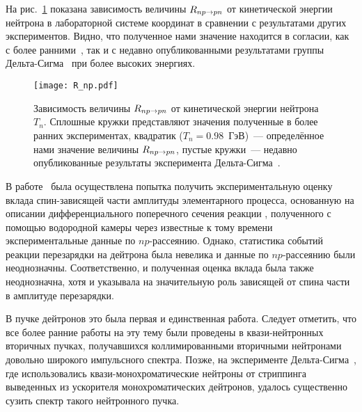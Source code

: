 На рис.~\ref{fig:R_np} показана зависимость величины $R_{np \rightarrow pn}$ от кинетической
энергии нейтрона в лабораторной системе координат в сравнении с результатами
других экспериментов. Видно, что полученное нами значение находится в согласии,
как с более ранними~\cite{pag88,lehar09}, так и с недавно опубликованными
результатами группы Дельта-Сигма~\cite{shar09} при более высоких энергиях.

\begin{figure}[!h]
  \centering
  \texttt{[image: R\_np.pdf]}
  \caption{Зависимость величины $R_{np \rightarrow pn}$ от кинетической энергии нейтрона
    $T_n$. Сплошные кружки представляют значения полученные в более ранних
    экспериментах, квадратик ($T_n = 0.98$~ГэВ)~--- определённое нами значение
    величины $R_{np \rightarrow pn}$, пустые кружки~--- недавно опубликованные результаты
    эксперимента Дельта-Сигма~\cite{shar09}.}
  \label{fig:R_np}
\end{figure}

В работе~\cite{alad75_2} была осуществлена попытка получить экспериментальную
оценку вклада спин-зависящей части амплитуды элементарного \np процесса,
основанную на описании дифференциального поперечного сечения реакции \dpchex,
полученного с помощью водородной камеры через известные к тому времени
экспериментальные данные по $np$-рассеянию. Однако, статистика событий реакции
перезарядки на дейтрона была невелика и данные по $np$-рассеянию были
неоднозначны. Соответственно, и полученная оценка вклада была также
неоднозначна, хотя и указывала на значительную роль зависящей от спина части в
амплитуде \np перезарядки.

В пучке дейтронов это была первая и единственная работа. Следует отметить, что
все более ранние работы на эту тему были проведены в квази-нейтронных вторичных
пучках, получавшихся коллимированными вторичными нейтронами довольно широкого
импульсного спектра. Позже, на эксперименте Дельта-Сигма~\cite{shar09}, где
использовались квази-монохроматические нейтроны от стриппинга выведенных из
ускорителя монохроматических дейтронов, удалось существенно сузить спектр
такого нейтронного пучка.

